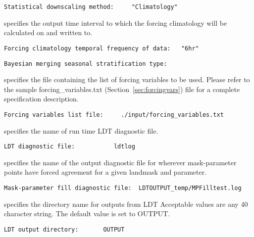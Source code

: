  \begin{Verbatim}[frame=single]
Statistical downscaling method:     "Climatology"
 \end{Verbatim}

 
  specifies the 
 output time interval to which the forcing climatology will be 
 calculated on and written to.
 

 \begin{Verbatim}[frame=single]
Forcing climatology temporal frequency of data:   "6hr"
 \end{Verbatim}

 
  
 

 \begin{Verbatim}[frame=single]
Bayesian merging seasonal stratification type:
 \end{Verbatim}

 
  specifies the file containing
 the list of forcing variables to be used. Please refer to the 
 sample forcing\_variables.txt (Section~\ref{sec:forcingvars})
 file for a complete specification description. 
 

 \begin{Verbatim}[frame=single]
Forcing variables list file:     ./input/forcing_variables.txt
 \end{Verbatim}

 
  specifies the name of run time
 LDT diagnostic file.
 

 \begin{Verbatim}[frame=single]
LDT diagnostic file:           ldtlog
 \end{Verbatim}

 
  specifies the name 
 of the output diagnostic file for wherever mask-parameter
 points have forced agreement for a given landmask and parameter.
 

 \begin{Verbatim}[frame=single]
Mask-parameter fill diagnostic file:  LDTOUTPUT_temp/MPFilltest.log
 \end{Verbatim}

 
  specifies the directory name for 
 outputs from LDT
 Acceptable values are any 40 character string.
 The default value is set to OUTPUT.
 

 \begin{Verbatim}[frame=single]
LDT output directory:       OUTPUT
 \end{Verbatim}

